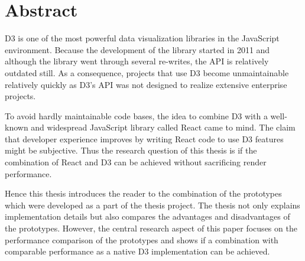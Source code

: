 \chapter{Abstract}

D3 is one of the most powerful data visualization libraries in the JavaScript environment. Because the development of the library started in 2011 and although the library went through several re-writes, the API is relatively outdated still. As a consequence, projects that use D3 become unmaintainable relatively quickly as D3's API was not designed to realize extensive enterprise projects.

To avoid hardly maintainable code bases, the idea to combine D3 with a well-known and widespread JavaScript library called React came to mind. The claim that developer experience improves by writing React code to use D3 features might be subjective. Thus the research question of this thesis is if the combination of React and D3 can be achieved without sacrificing render performance.

Hence this thesis introduces the reader to the combination of the prototypes which were developed as a part of the thesis project. The thesis not only explains implementation details but also compares the advantages and disadvantages of the prototypes. However, the central research aspect of this paper focuses on the performance comparison of the prototypes and shows if a combination with comparable performance as a native D3 implementation can be achieved.

